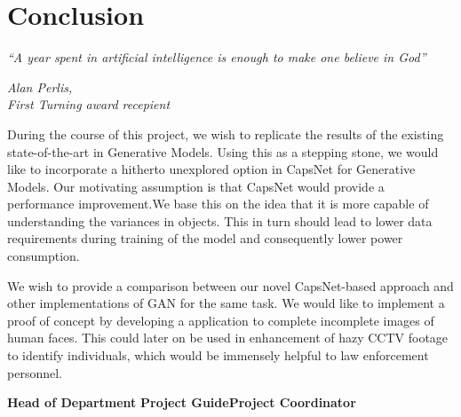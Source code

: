 \chapter{Conclusion}\label{ch:conclusion}
\epigraph{\textit{\Large “A year spent in artificial intelligence is enough to make one believe in God”}}{\textit{ \large Alan Perlis,\\ First Turning award recepient}}
During the course of this project, we wish to replicate the results of the existing state-of-the-art in Generative Models. Using this as a stepping stone, we would like to incorporate a hitherto unexplored option in CapsNet for Generative Models. Our motivating assumption is that CapsNet would provide a performance improvement.We base this on the idea that it is more capable of understanding the variances in objects. This in turn should lead to lower data requirements during training of the model and consequently lower power consumption. 

\par\bigskip We wish to provide a comparison between our novel CapsNet-based approach and other implementations of GAN for the same task. We would like to implement a proof of concept by developing a application to complete incomplete images of human faces. This could later on be used in enhancement of hazy CCTV footage to identify individuals, which would be immensely helpful to law enforcement personnel.

\vspace{200px}
\centering
\textbf{Head of Department}
\vspace{50px}
\flushleft\textbf{Project Guide}\hfill\textbf{Project Coordinator}